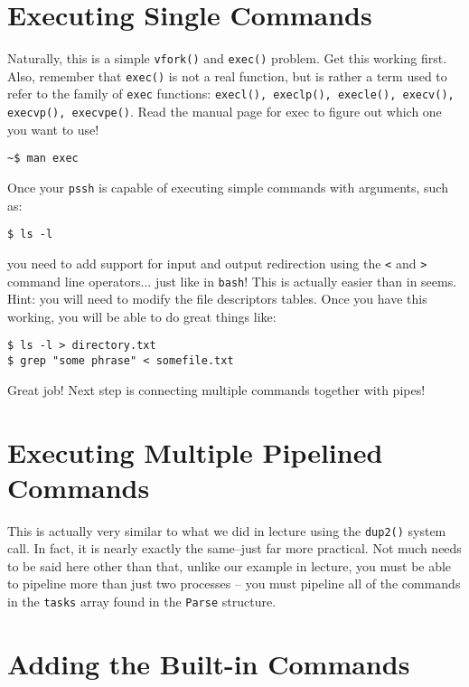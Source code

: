 \documentclass[10pt]{article}
\begin{document}
\section{Executing Single Commands}

Naturally, this is a simple \texttt{vfork()} and \texttt{exec()}
problem.  Get this working first.  Also, remember that \texttt{exec()}
is not a real function, but is rather a term used to refer to the family
of \texttt{exec} functions: \texttt{execl(), execlp(), execle(),
execv(), execvp(), execvpe()}.  Read the manual page for exec to figure
out which one you want to use!

\begin{verbatim}
~$ man exec
\end{verbatim}

Once your \texttt{pssh} is capable of executing simple commands with
arguments, such as:

\begin{verbatim}
$ ls -l
\end{verbatim}

you need to add support for input and output redirection using the
\texttt{<} and \texttt{>} command line operators... just like in
\texttt{bash}!  This is actually easier than in seems.  Hint: you will
need to modify the file descriptors tables.  Once you have this working,
you will be able to do great things like:

\begin{verbatim}
$ ls -l > directory.txt
$ grep "some phrase" < somefile.txt
\end{verbatim}

Great job!  Next step is connecting multiple commands together with
pipes!


\section{Executing Multiple Pipelined Commands}

This is actually very similar to what we did in lecture using the
\texttt{dup2()} system call.  In fact, it is nearly exactly the
same--just far more practical.  Not much needs to be said here other
than that, unlike our example in lecture, you must be able to pipeline
more than just two processes -- you must pipeline all of the commands in
the \texttt{tasks} array found in the \texttt{Parse} structure.


\section{Adding the Built-in Commands}
\end{document}
